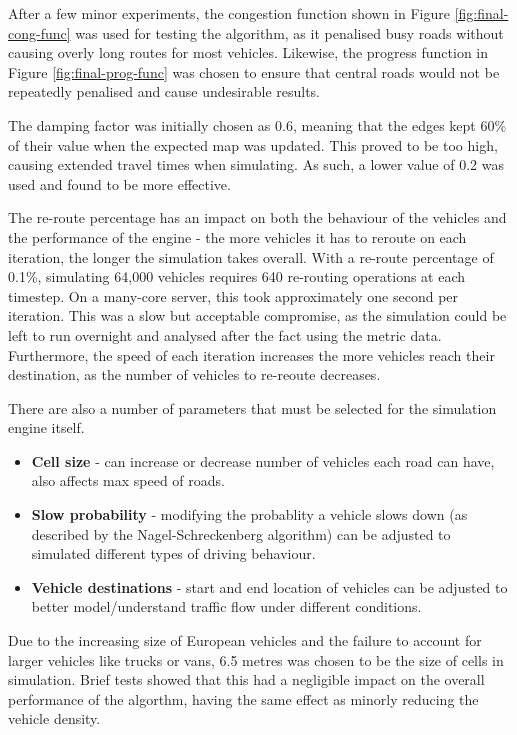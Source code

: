 \documentclass[ %
                    author={Alexander Hill},
                supervisor={Dr. Benjamin Sach},
                    degree={MEng},
                     title={MARMOSET},
                  subtitle={Multi-Agent Route Management using Online Simulation for Efficient Transportation},
                      type={research},
                      year={2016} ]{dissertation}
\begin{document}
After a few minor experiments, the congestion function shown in Figure
\ref{fig:final-cong-func} was used for testing the algorithm, as it penalised
busy roads without causing overly long routes for most vehicles. Likewise, the
progress function in Figure \ref{fig:final-prog-func} was chosen to ensure that
central roads would not be repeatedly penalised and cause undesirable results.

The damping factor was initially chosen as 0.6, meaning that the edges kept 60\%
of their value when the expected map was updated. This proved to be too high,
causing extended travel times when simulating. As such, a lower
value of 0.2 was used and found to be more effective.

The re-route percentage has an impact on both the behaviour of the vehicles and
the performance of the engine - the more vehicles it has to reroute on each
iteration, the longer the simulation takes overall. With a re-route percentage
of 0.1\%, simulating 64,000 vehicles requires 640 re-routing operations at each
timestep. On a many-core server, this took approximately one second per
iteration. This was a slow but acceptable compromise, as the simulation could be
left to run overnight and analysed after the fact using the metric data.
Furthermore, the speed of each iteration increases the more vehicles reach their
destination, as the number of vehicles to re-reoute decreases.

There are also a number of parameters that must be selected for the simulation
engine itself.

\begin{itemize}
    \item \textbf{Cell size} - can increase or decrease number of vehicles each
        road can have, also affects max speed of roads.
    \item \textbf{Slow probability} - modifying the probablity a vehicle slows
        down (as described by the Nagel-Schreckenberg algorithm) can be adjusted
        to simulated different types of driving behaviour.
    \item \textbf{Vehicle destinations} - start and end location of vehicles can
        be adjusted to better model/understand traffic flow under different
        conditions.
\end{itemize}

Due to the increasing size of European vehicles and the failure to account for
larger vehicles like trucks or vans, 6.5 metres was chosen to be the size of
cells in simulation. Brief tests showed that this had a negligible impact on
the overall performance of the algorthm, having the same effect as minorly
reducing the vehicle density.
\end{document}
